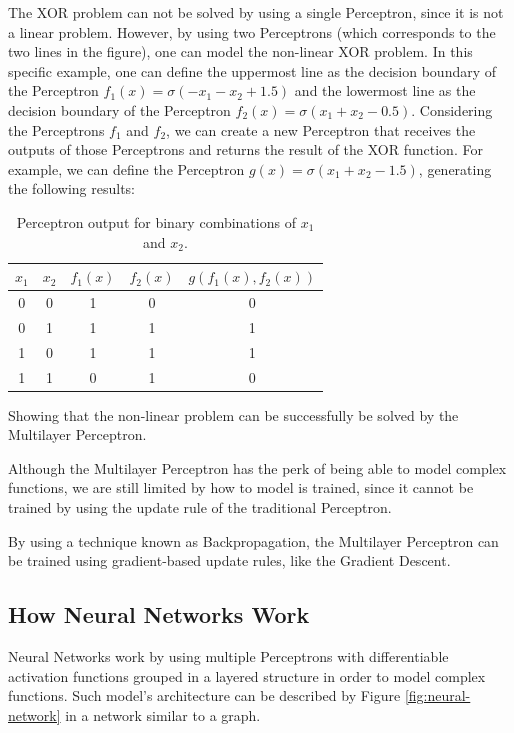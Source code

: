 The XOR problem can not be solved by using a single Perceptron, since it is not a linear problem.
However, by using two Perceptrons (which corresponds to the two lines in the figure), one can model the non-linear XOR problem.  
In this specific example, one can define the uppermost line as the decision boundary of the Perceptron \(f_1(x) = \sigma(- x_1 - x_2 + 1.5)\) and the lowermost line as the decision boundary of the Perceptron \(f_2(x) = \sigma(x_1 + x_2 - 0.5)\).
Considering the Perceptrons \(f_1\) and \(f_2\), we can create a new Perceptron that receives the outputs of those Perceptrons and returns the result of the XOR function. 
For example, we can define the Perceptron \(g(x) = \sigma(x_1 + x_2 - 1.5)\), generating the following results:
\begin{table}[h!]
    \centering
    \begin{tabular}{|c|c|c|c|c|}
    \hline
    $x_1$ & $x_2$ & $f_1(x)$ & $f_2(x)$ & $g(f_1(x), f_2(x))$ \\ \hline
    0     & 0     & 1     & 0     & 0   \\ \hline
    0     & 1     & 1     & 1     & 1   \\ \hline
    1     & 0     & 1     & 1     & 1   \\ \hline
    1     & 1     & 0     & 1     & 0   \\ \hline
    \end{tabular}
    \caption{Perceptron output for binary combinations of \(x_1\) and \(x_2\).}
    \label{tab:xor_table}
\end{table}

\noindent Showing that the non-linear problem can be successfully be solved by the Multilayer Perceptron.

Although the Multilayer Perceptron has the perk of being able to model complex functions, we are still limited by how to model is trained, since it cannot be trained by using the update rule of the traditional Perceptron.

By using a technique known as Backpropagation, the Multilayer Perceptron can be trained using gradient-based update rules, like the Gradient Descent.
\subsection{How Neural Networks Work}

Neural Networks work by using multiple Perceptrons with differentiable activation functions grouped in a layered structure in order to model complex functions. 
Such model's architecture can be described by Figure \ref{fig:neural-network} in a network similar to a graph.


